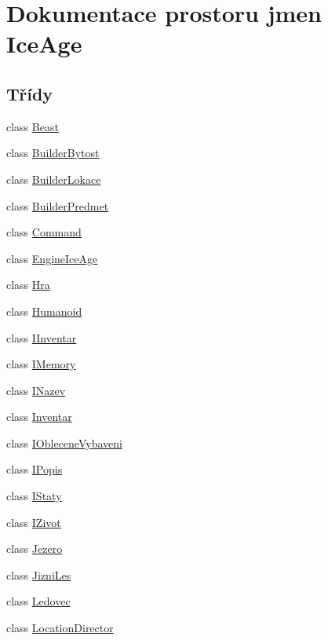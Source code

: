 \hypertarget{namespaceIceAge}{}\section{Dokumentace prostoru jmen Ice\+Age}
\label{namespaceIceAge}
\subsection*{Třídy}
\begin{DoxyCompactItemize}
\item 
class \hyperlink{classIceAge_1_1Beast}{Beast}
\item 
class \hyperlink{classIceAge_1_1BuilderBytost}{Builder\+Bytost}
\item 
class \hyperlink{classIceAge_1_1BuilderLokace}{Builder\+Lokace}
\item 
class \hyperlink{classIceAge_1_1BuilderPredmet}{Builder\+Predmet}
\item 
class \hyperlink{classIceAge_1_1Command}{Command}
\item 
class \hyperlink{classIceAge_1_1EngineIceAge}{Engine\+Ice\+Age}
\item 
class \hyperlink{classIceAge_1_1Hra}{Hra}
\item 
class \hyperlink{classIceAge_1_1Humanoid}{Humanoid}
\item 
class \hyperlink{classIceAge_1_1IInventar}{I\+Inventar}
\item 
class \hyperlink{classIceAge_1_1IMemory}{I\+Memory}
\item 
class \hyperlink{classIceAge_1_1INazev}{I\+Nazev}
\item 
class \hyperlink{classIceAge_1_1Inventar}{Inventar}
\item 
class \hyperlink{classIceAge_1_1IObleceneVybaveni}{I\+Oblecene\+Vybaveni}
\item 
class \hyperlink{classIceAge_1_1IPopis}{I\+Popis}
\item 
class \hyperlink{classIceAge_1_1IStaty}{I\+Staty}
\item 
class \hyperlink{classIceAge_1_1IZivot}{I\+Zivot}
\item 
class \hyperlink{classIceAge_1_1Jezero}{Jezero}
\item 
class \hyperlink{classIceAge_1_1JizniLes}{Jizni\+Les}
\item 
class \hyperlink{classIceAge_1_1Ledovec}{Ledovec}
\item 
class \hyperlink{classIceAge_1_1LocationDirector}{Location\+Director}
\item 

\end{DoxyCompactItemize}
